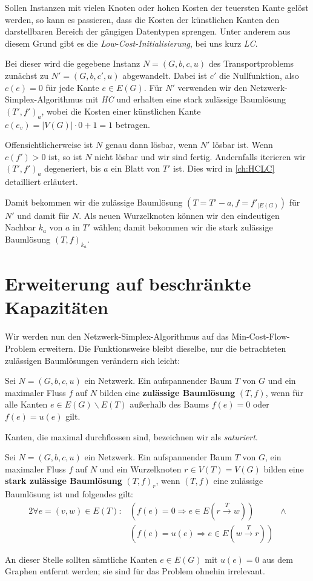 Sollen Instanzen mit vielen Knoten oder hohen Kosten der teuersten Kante gelöst werden, so kann es passieren, dass die Kosten der künstlichen Kanten den darstellbaren Bereich der gängigen Datentypen sprengen. Unter anderem aus diesem Grund gibt es die \emph{Low-Cost-Initialisierung}, bei uns kurz \emph{LC}.

Bei dieser wird die gegebene Instanz $N=(G,b,c,u)$ des Transportproblems zunächst zu $N'=(G,b,c',u)$ abgewandelt. Dabei ist $c'$ die Nullfunktion, also $c(e)=0$ für jede Kante $e\in E(G)$. Für $N'$ verwenden wir den Netzwerk-Simplex-Algorithmus mit \emph{HC} und erhalten eine stark zulässige Baumlösung $(T',f')_a$, wobei die Kosten einer künstlichen Kante $c(e_v)=|V(G)|\cdot0+1=1$ betragen.

Offensichtlicherweise ist $N$ genau dann lösbar, wenn $N'$ lösbar ist. Wenn $c(f')>0$ ist, so ist $N$ nicht lösbar und wir sind fertig. Andernfalls iterieren wir $(T',f')_a$ degeneriert, bis $a$ ein Blatt von $T'$ ist. Dies wird in \cref{ch:HCLC} detailliert erläutert.

Damit bekommen wir die zulässige Baumlösung $(T=T'-a, f=f'_{|E(G)})$ für $N'$ und damit für $N$. Als neuen Wurzelknoten können wir den eindeutigen Nachbar $k_a$ von $a$ in $T'$ wählen; damit bekommen wir die stark zulässige Baumlösung $(T,f)_{k_a}$.

\section{Erweiterung auf beschränkte Kapazitäten}\label{ch:alg2}
Wir werden nun den Netzwerk-Simplex-Algorithmus auf das Min-Cost-Flow-Problem erweitern. Die Funktionsweise bleibt dieselbe, nur die betrachteten zulässigen Baumlösungen verändern sich leicht:

\begin{defn}Sei $N=(G,b,c,u)$ ein Netzwerk. Ein aufspannender Baum $T$ von $G$ und ein maximaler Fluss $f$ auf $N$ bilden eine \textbf{zulässige Baumlösung} $(T,f)$, wenn für alle Kanten $e\in E(G)\backslash E(T)$ außerhalb des Baums $f(e) = 0$ oder $f(e)=u(e)$ gilt.\end{defn}
\begin{anm}Kanten, die maximal durchflossen sind, bezeichnen wir als \emph{saturiert}.\end{anm}

\begin{defn}Sei $N=(G,b,c,u)$ ein Netzwerk. Ein aufspannender Baum $T$ von $G$, ein maximaler Fluss $f$ auf $N$ und ein Wurzelknoten $r\in V(T)=V(G)$ bilden eine \textbf{stark zulässige Baumlösung} $(T,f)_r$, wenn $(T,f)$ eine zulässige Baumlösung ist und folgendes gilt:
\begin{alignat*}{2}
\forall e=(v,w)\in E(T)\colon&(f(e)=0 \Rightarrow e\in E(r\xrightarrow{T}w))&\land\\
&(f(e)=u(e) \Rightarrow e\in E(w\xrightarrow{T}r))
\end{alignat*}\end{defn}
\begin{anm}An dieser Stelle sollten sämtliche Kanten $e\in E(G)$ mit $u(e)=0$ aus dem Graphen entfernt werden; sie sind für das Problem ohnehin irrelevant.\end{anm}

